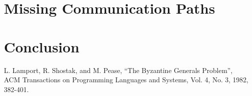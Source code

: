 \documentclass[10pt]{amsart}
\begin{document}
\section{Missing Communication Paths}


\section{Conclusion}




\begin{thebibliography}{10}

 {
    L. Lamport, R. Shostak, and M. Pease, ``The Byzantine Generals Problem'', ACM Transactions on 
    Programming Languages and Systems, Vol. 4, No. 3, 1982, 382-401.
}
\end{thebibliography}
\end{document}
